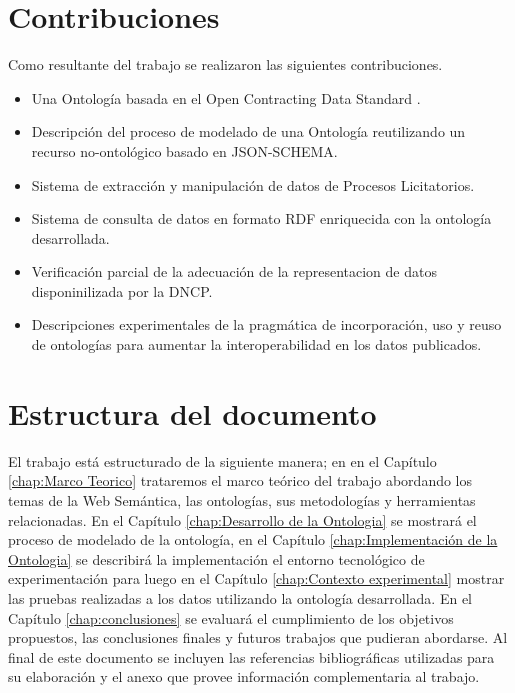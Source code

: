 \section{Contribuciones}
\label{Contribuciones}
Como resultante del trabajo se realizaron las siguientes contribuciones.
\begin{itemize}
\item \label{contrib:3}Una Ontología basada en el Open Contracting Data Standard \cite{OCDSReleaseSchema:online}.
\item \label{contrib:2}Descripción del proceso de modelado de una Ontología reutilizando un recurso no-ontológico basado en JSON-SCHEMA\cite {JSONSche10:online}.
\item \label{contrib:1}Sistema de extracción y manipulación de datos de Procesos Licitatorios.
\item \label{contrib:4}Sistema de consulta de datos en formato RDF enriquecida con la ontología desarrollada.
\item \label{contrib:6}Verificación parcial de la adecuación de la representacion de datos disponinilizada por la DNCP.
\item \label{contrib:5}Descripciones experimentales de la pragmática de incorporación, uso y reuso de ontologías para aumentar la interoperabilidad en los datos publicados.

\end{itemize}
 

\section{Estructura del documento}
El trabajo está estructurado de la siguiente manera; en  en el  Capítulo \ref{chap:Marco Teorico}  trataremos el marco teórico del trabajo abordando los temas de la Web Semántica, las ontologías, sus metodologías y herramientas relacionadas. En el Capítulo \ref{chap:Desarrollo de la Ontologia} se mostrará el proceso de modelado de la ontología, en el Capítulo \ref{chap:Implementación de la Ontologia} se describirá la implementación el entorno tecnológico de experimentación para luego en el Capítulo  \ref{chap:Contexto experimental} mostrar las pruebas realizadas a los datos utilizando la ontología desarrollada. En el Capítulo \ref{chap:conclusiones} se evaluará el cumplimiento de los objetivos propuestos, las conclusiones finales y futuros trabajos que pudieran abordarse. Al final de este documento  se  incluyen las referencias bibliográficas utilizadas para su elaboración y el anexo que provee información complementaria al trabajo.


